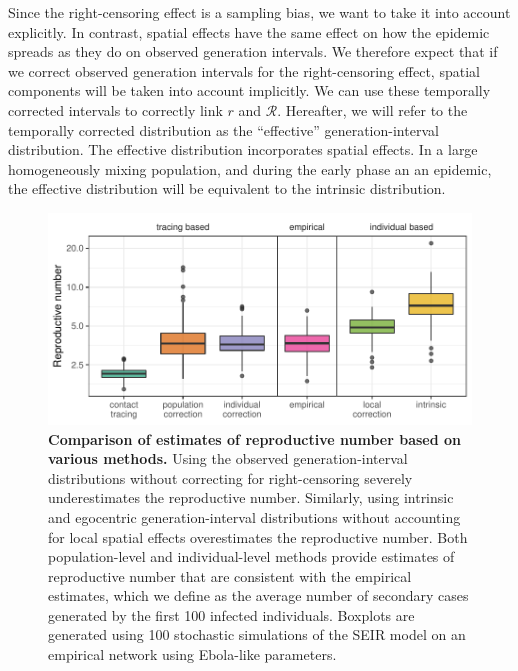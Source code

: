 \documentclass[12pt]{article}
\newcommand{\RR}{\ensuremath{{\mathcal R}}}
\begin{document}
Since the right-censoring effect is a sampling bias, we want to take it into account explicitly.
In contrast, spatial effects have the same effect on how the epidemic spreads as they do on observed generation intervals. 
We therefore expect that if we correct observed generation intervals for the right-censoring effect, spatial components will be taken into account implicitly. 
We can use these temporally corrected intervals to correctly link $r$ and $\RR$.
Hereafter, we will refer to the temporally corrected distribution as the ``effective'' generation-interval distribution. 
The effective distribution incorporates spatial effects. 
In a large homogeneously mixing population, and during the early phase an an epidemic, the effective distribution will be equivalent to the intrinsic distribution.

\begin{figure}[!pbth]
\includegraphics[width=\textwidth]{../fig/cmp_reproductive.pdf}
\caption{\textbf{Comparison of estimates of reproductive number based on various methods.}
Using the observed generation-interval distributions without correcting for right-censoring severely underestimates the reproductive number.
Similarly, using intrinsic and egocentric generation-interval distributions without accounting for local spatial effects overestimates the reproductive number.
Both population-level and individual-level methods provide estimates of reproductive number that are consistent with the empirical estimates, which we define as the average number of secondary cases generated by the first 100 infected individuals.
Boxplots are generated using 100 stochastic simulations of the SEIR model on an empirical network using Ebola-like parameters.
}
\label{fig:cmp}
\end{figure}
\end{document}
